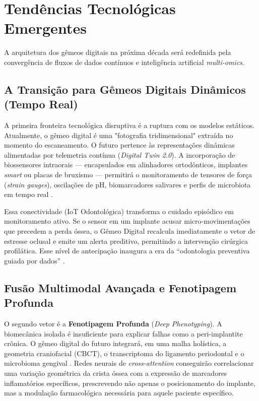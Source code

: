\section{Tendências Tecnológicas Emergentes}

A arquitetura dos gêmeos digitais na próxima década será redefinida pela convergência de fluxos de dados contínuos e inteligência artificial \textit{multi-omics}. 

\subsection{A Transição para Gêmeos Digitais Dinâmicos (Tempo Real)}

A primeira fronteira tecnológica disruptiva é a ruptura com os modelos estáticos. Atualmente, o gêmeo digital é uma "fotografia tridimensional" extraída no momento do escaneamento. O futuro pertence às representações dinâmicas alimentadas por telemetria contínua (\textit{Digital Twin 2.0}). A incorporação de biossensores intraorais — encapsulados em alinhadores ortodônticos, implantes \textit{smart} ou placas de bruxismo — permitirá o monitoramento de tensores de força (\textit{strain gauges}), oscilações de pH, biomarcadores salivares e perfis de microbiota em tempo real \cite{khoshfekr2025digital}. 

Essa conectividade (IoT Odontológica) transforma o cuidado episódico em monitoramento ativo. Se o sensor em um implante acusar micro-movimentações que precedem a perda óssea, o Gêmeo Digital recalcula imediatamente o vetor de estresse oclusal e emite um alerta preditivo, permitindo a intervenção cirúrgica profilática. Esse nível de antecipação inaugura a era da ``odontologia preventiva guiada por dados'' \cite{shen2024effectiveness}.

\subsection{Fusão Multimodal Avançada e Fenotipagem Profunda}

O segundo vetor é a \textbf{Fenotipagem Profunda} (\textit{Deep Phenotyping}). A biomecânica isolada é insuficiente para explicar falhas como a peri-implantite crônica. O gêmeo digital do futuro integrará, em uma malha holística, a geometria craniofacial (CBCT), o transcriptoma do ligamento periodontal e o microbioma gengival \cite{techsoc2025towards}. Redes neurais de \textit{cross-attention} conseguirão correlacionar uma variação geométrica da crista óssea com a expressão de marcadores inflamatórios específicos, prescrevendo não apenas o posicionamento do implante, mas a modulação farmacológica necessária para aquele paciente específico.

